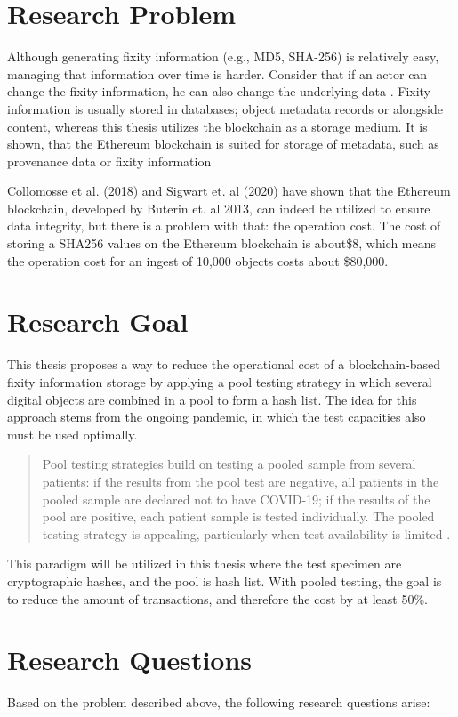 \section{Research Problem}
Although generating fixity information (e.g., MD5, SHA-256) is relatively easy, managing that information over time is harder. Consider that if an actor can change the fixity information, he can also change the underlying data \cite[35]{kirschenbaum2010digital}. Fixity information is usually stored in databases; object metadata records or alongside content, whereas this thesis utilizes the blockchain as a storage medium.
It is shown, that the Ethereum blockchain is suited for storage of metadata, such as provenance data or fixity information

Collomosse et al. (2018) and Sigwart et. al (2020) have shown that the Ethereum blockchain, developed by Buterin et. al 2013, can indeed be utilized to ensure data integrity, but there is a problem with that: the operation cost. The cost of storing a SHA256 values on the Ethereum blockchain is about\$8, which means the operation cost for an ingest of 10,000 objects costs about \$80,000.

\section{Research Goal}
This thesis proposes a way to reduce the operational cost of a blockchain-based fixity information storage by applying a pool testing strategy in which several digital objects are combined in a pool to form a hash list. The idea for this approach stems from the ongoing pandemic, in which the test capacities also must be used optimally.
\begin{quote}
Pool testing strategies build on testing a pooled sample from several patients: if the results from the pool test are negative, all patients in the pooled sample are declared not to have COVID-19; if the results of the pool are positive, each patient sample is tested individually. The pooled testing strategy is appealing, particularly when test availability is limited \cite[1]{cherif2020simulation}.
\end{quote}
This paradigm will be utilized in this thesis where the test specimen are cryptographic hashes, and the pool is hash list. With pooled testing, the goal is to reduce the amount of transactions, and therefore the cost by at least 50\%.

\section{Research Questions}
Based on the problem described above, the following research questions arise:

